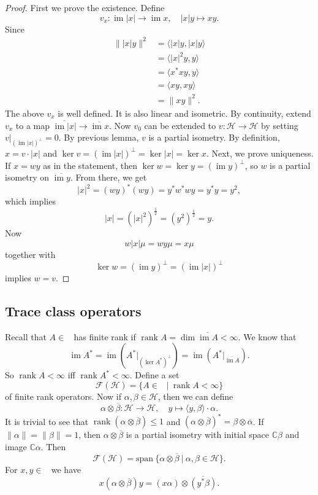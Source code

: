 \documentclass[10pt, a4paper]{article}
\newenvironment{noticeC}{%
  \tcolorbox[%
  notitle,
  empty,
  enhanced,  %
  breakable,
  coltext=black, 
  fontupper=\rmfamily,
  noparskip,
  sharp corners,
  boxrule=-1pt,  %
  frame hidden,
  left=7pt,  %
  right=7pt,
  top=5pt,
  bottom=5pt,
  before skip=2.5ex plus 2pt,
  after skip=2.5ex plus 2pt,
  overlay unbroken and last={%
  },
  ]}
{\endtcolorbox}
\newenvironment{myproof}%
  {\begin{noticeC}\begin{proof}}%
  {\end{proof}\end{noticeC}}
\newcommand{\C}{\mathbb {C}}
\DeclareMathOperator{\im}{im}
\DeclareMathOperator{\rank}{rank}
\DeclareMathOperator{\bh}{\mathcal{B} (\mathcal{H})}
\begin{document}
\begin{myproof}
  First we prove the existence. Define $$v_x : \im |x| \to \im x,\quad |x|y \mapsto xy.$$
  Since \begin{align*}
    \| |x| y\|^2 &= \langle |x|y, |x|y \rangle \\
    &= \langle |x|^2 y, y\rangle\\
    &= \langle x^* x y, y\rangle\\
    &= \langle xy, xy\rangle\\
    &= \| xy\|^2.
  \end{align*}
  The above $v_x$ is well defined. It is also linear and isometric.
  By continuity, extend $v_x$ to a map $\overline{\im |x|} \to \overline{\im x}$.
  Now $v_0$ can be extended to $v: \mathcal{H} \to \mathcal{H}$ by setting 
  $v\big|_{(\im |x|)^\perp} = 0.$ By previous lemma, $v$ is a partial isometry.
  By definition, $x = v \cdot |x|$ and $\ker v = (\im |x|)^\perp = \ker |x| = \ker x$.
  Next, we prove uniqueness. If $x = wy$ as in the statement, then $\ker w = \ker y = (\im y)^\perp$,
  so $w$ is a partial isometry on $\overline{\im y}$. From there, we get 
  $$|x|^2 = (wy)^* (wy) = y^* w^* w y = y^* y = y^2,$$
  which implies 
  $$|x| = (|x|^2)^{\frac{1}{2}} = (y^2)^{\frac{1}{2}} = y.$$
  Now $$w|x| \mu = wy \mu = x\mu$$
  together with 
  $$\ker w = (\im y)^\perp = (\im |x|)^\perp$$ implies $w = v$.
\end{myproof}

\subsection{Trace class operators}

Recall that $A \in \bh$ has finite rank if $\rank A = \dim \overline{\im A} < \infty$.
We know that 
$$\im A^* = \im (A^* |_{(\ker A^*)^\perp}) = \im (A^* \big|_{\overline{\im A}}).$$
So $\rank A < \infty$ iff $\rank A^* < \infty$. Define a set
$$\mathcal{F} (\mathcal{H}) = \{A \in \bh\ |\ \rank A < \infty\}$$
of finite rank operators. Now if $\alpha, \beta \in \mathcal{H}$, then we can define 
$$\alpha \otimes \overline{\beta} : \mathcal{H} \to \mathcal{H},\quad y \mapsto \langle y, \beta \rangle \cdot \alpha.$$
It is trivial to see that $\rank (\alpha \otimes \overline{\beta}) \leq 1$ and $(\alpha \otimes \overline{\beta})^* = \beta \otimes \overline{\alpha}$.
If $\| \alpha\| = \| \beta \| = 1$, then $\alpha \otimes \overline{\beta}$
is a partial isometry with initial space $\C \beta$ and image $\C \alpha$.
Then $$\mathcal{F} (\mathcal{H}) = \mathrm{span}\ \{\alpha \otimes \overline{\beta}\ |\ \alpha, \beta \in \mathcal{H}\}.$$
For $x, y \in \bh$ we have $$x (\alpha \otimes \overline{\beta}) y = (x \alpha) \otimes \overline{(y^* \beta)}.$$  
\end{document}
